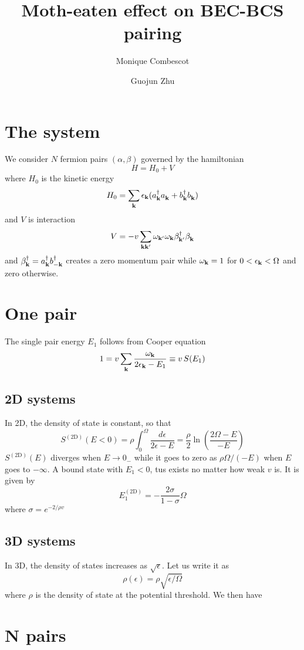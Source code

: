\documentclass{article}
\author{Monique Combescot \and Guojun Zhu}
\title{Moth-eaten effect on BEC-BCS pairing}
\begin{document}
\maketitle

\section{The system}
We consider $N$ fermion pairs $(\alpha,\beta)$ governed by the hamiltonian
\begin{equation}
H=H_{0}+V
\end{equation}
where $H_0$ is the kinetic energy 
\begin{equation}
H_0=\sum_{\mathbf{k}}\epsilon_{\mathbf{k}}(a^\dagger_{\mathbf{k}}{}a^{}_{\mathbf{k}}+b^\dagger_{\mathbf{k}}{}b^{}_{\mathbf{k}})
\label{eq:}
\end{equation}
and $V$ is interaction
\begin{equation}
V=-v\sum_{\mathbf{k}\mathbf{k}'}\omega_{\mathbf{k}'}\omega_{\mathbf{k}}\beta^\dagger_{\mathbf{k}'}{}\beta^{}_{\mathbf{k}}
\label{eq:}
\end{equation}
and $\beta^\dagger_{\mathbf{k}}=a^\dagger_{\mathbf{k}}b^\dagger_{-\mathbf{k}}$ creates a zero momentum pair while $\omega_{\mathbf{k}}=1$ for $0<\epsilon_{\mathbf{k}}<\Omega$ and zero otherwise.  
\section{One pair}
The single pair energy $E_1$ follows from Cooper equation
\begin{equation}
1=v\sum_{\mathbf{k}}\frac{\omega_{\mathbf{k}}}{2\epsilon_{\mathbf{k}}-E_1}\equiv{}v\,S(E_1)
\label{eq:}
\end{equation}
\subsection{2D systems}
In 2D, the density of state is constant, so that 
\begin{equation}
S^{(\text{2D})}(E<0)=\rho\int_0^{\Omega}\frac{d\epsilon}{2\epsilon-E}=\frac{\rho}{2}\ln\left(\frac{2\Omega-E}{-E}\right)
\label{eq:}
\end{equation}
$S^{(\text{2D})}(E)$ diverges when $E\rightarrow{}0_{-}$ while it goes to zero as $\rho\Omega/(-E)$ when $E$ goes to $-\infty$. A bound state with $E_1<0$, tus exists no matter how weak $v$ is. It is given by 
\begin{equation}
E_1^{(\text{2D})}=-\frac{2\sigma}{1-\sigma}\Omega
\label{eq:}
\end{equation}
where $\sigma=e^{-2/\rho{v}}$
\subsection{3D systems}
In 3D, the density of states increases as $\sqrt{\epsilon}$. Let us write it as 
\begin{equation}
\rho(\epsilon)=\rho\sqrt{\epsilon/\Omega}
\label{eq:}
\end{equation}
where $\rho$ is the density of state at the potential threshold. We then have

\section{N pairs}
{}


%

\end{document}
